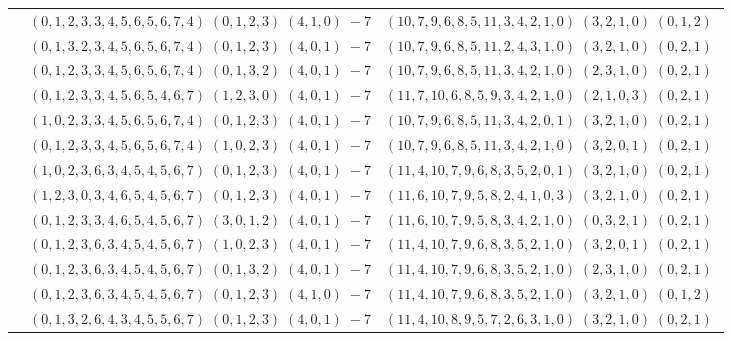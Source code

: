 \documentclass[11pt]{article}
\begin{document}
\begin{longtable}[l]{|c|c|c|}
 \cline{2-3} 
 & $(0 ,1 ,2 ,3 ,3 ,4 ,5 ,6 ,5 ,6 ,7 ,4) \;(0 ,1 ,2 ,3) \;(4 ,1 ,0) \;-7$ & $(10 ,7 ,9 ,6 ,8 ,5 ,11 ,3 ,4 ,2 ,1 ,0) \;(3 ,2 ,1 ,0) \;(0 ,1 ,2) \;$\\ 
 \cline{2-3} 
 & $(0 ,1 ,3 ,2 ,3 ,4 ,5 ,6 ,5 ,6 ,7 ,4) \;(0 ,1 ,2 ,3) \;(4 ,0 ,1) \;-7$ & $(10 ,7 ,9 ,6 ,8 ,5 ,11 ,2 ,4 ,3 ,1 ,0) \;(3 ,2 ,1 ,0) \;(0 ,2 ,1) \;$\\ 
 \cline{2-3} 
 & $(0 ,1 ,2 ,3 ,3 ,4 ,5 ,6 ,5 ,6 ,7 ,4) \;(0 ,1 ,3 ,2) \;(4 ,0 ,1) \;-7$ & $(10 ,7 ,9 ,6 ,8 ,5 ,11 ,3 ,4 ,2 ,1 ,0) \;(2 ,3 ,1 ,0) \;(0 ,2 ,1) \;$\\ 
 \cline{2-3} 
 & $(0 ,1 ,2 ,3 ,3 ,4 ,5 ,6 ,5 ,4 ,6 ,7) \;(1 ,2 ,3 ,0) \;(4 ,0 ,1) \;-7$ & $(11 ,7 ,10 ,6 ,8 ,5 ,9 ,3 ,4 ,2 ,1 ,0) \;(2 ,1 ,0 ,3) \;(0 ,2 ,1) \;$\\ 
 \cline{2-3} 
 & $(1 ,0 ,2 ,3 ,3 ,4 ,5 ,6 ,5 ,6 ,7 ,4) \;(0 ,1 ,2 ,3) \;(4 ,0 ,1) \;-7$ & $(10 ,7 ,9 ,6 ,8 ,5 ,11 ,3 ,4 ,2 ,0 ,1) \;(3 ,2 ,1 ,0) \;(0 ,2 ,1) \;$\\ 
 \cline{2-3} 
 & $(0 ,1 ,2 ,3 ,3 ,4 ,5 ,6 ,5 ,6 ,7 ,4) \;(1 ,0 ,2 ,3) \;(4 ,0 ,1) \;-7$ & $(10 ,7 ,9 ,6 ,8 ,5 ,11 ,3 ,4 ,2 ,1 ,0) \;(3 ,2 ,0 ,1) \;(0 ,2 ,1) \;$\\ 
 \cline{2-3} 
 & $(1 ,0 ,2 ,3 ,6 ,3 ,4 ,5 ,4 ,5 ,6 ,7) \;(0 ,1 ,2 ,3) \;(4 ,0 ,1) \;-7$ & $(11 ,4 ,10 ,7 ,9 ,6 ,8 ,3 ,5 ,2 ,0 ,1) \;(3 ,2 ,1 ,0) \;(0 ,2 ,1) \;$\\ 
 \cline{2-3} 
 & $(1 ,2 ,3 ,0 ,3 ,4 ,6 ,5 ,4 ,5 ,6 ,7) \;(0 ,1 ,2 ,3) \;(4 ,0 ,1) \;-7$ & $(11 ,6 ,10 ,7 ,9 ,5 ,8 ,2 ,4 ,1 ,0 ,3) \;(3 ,2 ,1 ,0) \;(0 ,2 ,1) \;$\\ 
 \cline{2-3} 
 & $(0 ,1 ,2 ,3 ,3 ,4 ,6 ,5 ,4 ,5 ,6 ,7) \;(3 ,0 ,1 ,2) \;(4 ,0 ,1) \;-7$ & $(11 ,6 ,10 ,7 ,9 ,5 ,8 ,3 ,4 ,2 ,1 ,0) \;(0 ,3 ,2 ,1) \;(0 ,2 ,1) \;$\\ 
 \cline{2-3} 
 & $(0 ,1 ,2 ,3 ,6 ,3 ,4 ,5 ,4 ,5 ,6 ,7) \;(1 ,0 ,2 ,3) \;(4 ,0 ,1) \;-7$ & $(11 ,4 ,10 ,7 ,9 ,6 ,8 ,3 ,5 ,2 ,1 ,0) \;(3 ,2 ,0 ,1) \;(0 ,2 ,1) \;$\\ 
 \cline{2-3} 
 & $(0 ,1 ,2 ,3 ,6 ,3 ,4 ,5 ,4 ,5 ,6 ,7) \;(0 ,1 ,3 ,2) \;(4 ,0 ,1) \;-7$ & $(11 ,4 ,10 ,7 ,9 ,6 ,8 ,3 ,5 ,2 ,1 ,0) \;(2 ,3 ,1 ,0) \;(0 ,2 ,1) \;$\\ 
 \cline{2-3} 
 & $(0 ,1 ,2 ,3 ,6 ,3 ,4 ,5 ,4 ,5 ,6 ,7) \;(0 ,1 ,2 ,3) \;(4 ,1 ,0) \;-7$ & $(11 ,4 ,10 ,7 ,9 ,6 ,8 ,3 ,5 ,2 ,1 ,0) \;(3 ,2 ,1 ,0) \;(0 ,1 ,2) \;$\\ 
 \cline{2-3} 
 & $(0 ,1 ,3 ,2 ,6 ,4 ,3 ,4 ,5 ,5 ,6 ,7) \;(0 ,1 ,2 ,3) \;(4 ,0 ,1) \;-7$ & $(11 ,4 ,10 ,8 ,9 ,5 ,7 ,2 ,6 ,3 ,1 ,0) \;(3 ,2 ,1 ,0) \;(0 ,2 ,1) \;$\\ 

\end{longtable}
\end{document}

